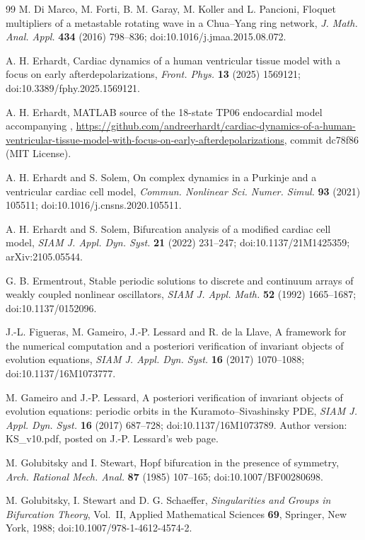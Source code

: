 \documentclass[11pt]{article}
\theoremstyle{definition}
\begin{document}
\begin{thebibliography}{99}
 M. Di Marco, M. Forti, B. M. Garay, M. Koller and L. Pancioni, Floquet multipliers of a metastable rotating wave in a Chua--Yang ring network, \emph{J. Math. Anal. Appl.} \textbf{434} (2016) 798--836; doi:10.1016/j.jmaa.2015.08.072.

 A. H. Erhardt, Cardiac dynamics of a human ventricular tissue model with a focus on early afterdepolarizations, \emph{Front. Phys.} \textbf{13} (2025) 1569121; doi:10.3389/fphy.2025.1569121.

 A. H. Erhardt, MATLAB source of the 18-state TP06 endocardial model accompanying \cite{erhardt2025}, \url{https://github.com/andreerhardt/cardiac-dynamics-of-a-human-ventricular-tissue-model-with-focus-on-early-afterdepolarizations}, commit dc78f86 (MIT License).

 A. H. Erhardt and S. Solem, On complex dynamics in a Purkinje and a ventricular cardiac cell model, \emph{Commun. Nonlinear Sci. Numer. Simul.} \textbf{93} (2021) 105511; doi:10.1016/j.cnsns.2020.105511.

 A. H. Erhardt and S. Solem, Bifurcation analysis of a modified cardiac cell model, \emph{SIAM J. Appl. Dyn. Syst.} \textbf{21} (2022) 231--247; doi:10.1137/21M1425359; arXiv:2105.05544.

 G. B. Ermentrout, Stable periodic solutions to discrete and continuum arrays of weakly coupled nonlinear oscillators, \emph{SIAM J. Appl. Math.} \textbf{52} (1992) 1665--1687; doi:10.1137/0152096.

 J.-L. Figueras, M. Gameiro, J.-P. Lessard and R. de la Llave, A framework for the numerical computation and a posteriori verification of invariant objects of evolution equations, \emph{SIAM J. Appl. Dyn. Syst.} \textbf{16} (2017) 1070--1088; doi:10.1137/16M1073777.

 M. Gameiro and J.-P. Lessard, A posteriori verification of invariant objects of evolution equations: periodic orbits in the Kuramoto--Sivashinsky PDE, \emph{SIAM J. Appl. Dyn. Syst.} \textbf{16} (2017) 687--728; doi:10.1137/16M1073789. Author version: KS\_v10.pdf, posted on J.-P. Lessard's web page.

 M. Golubitsky and I. Stewart, Hopf bifurcation in the presence of symmetry, \emph{Arch. Rational Mech. Anal.} \textbf{87} (1985) 107--165; doi:10.1007/BF00280698.

 M. Golubitsky, I. Stewart and D. G. Schaeffer, \emph{Singularities and Groups in Bifurcation Theory}, Vol.~II, Applied Mathematical Sciences \textbf{69}, Springer, New York, 1988; doi:10.1007/978-1-4612-4574-2.


\end{thebibliography}
\end{document}
